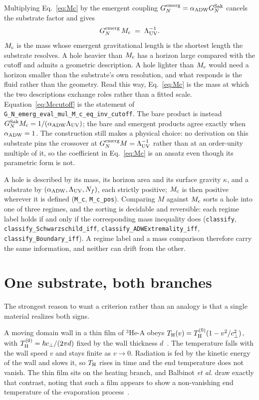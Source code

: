 \documentclass[aps,prl,reprint,nofootinbib,superscriptaddress]{revtex4-2}
\newcommand{\Thawk}{T_{\rm H}}
\newcommand{\Mc}{M_{\rm c}}
\newcommand{\aADW}{\alpha_{\rm ADW}}
\newcommand{\Ladw}{\Lambda_{\rm UV}}
\newcommand{\Nf}{N_f}
\newcommand{\GNem}{G_N^{\rm emerg}}
\begin{document}
Multiplying Eq.~\eqref{eq:Mc} by the emergent coupling $\GNem = \aADW G_N^{\rm Sak}$ cancels the substrate factor and gives
\begin{equation}
  \GNem\,\Mc \;=\; \Ladw^{-1}.
  \label{eq:Mccutoff}
\end{equation}
$\Mc$ is the mass whose emergent gravitational length is the shortest
length the substrate resolves. A hole heavier than $\Mc$ has a horizon
large compared with the cutoff and admits a geometric description. A hole
lighter than $\Mc$ would need a horizon smaller than the substrate's own
resolution, and what responds is the fluid rather than the geometry. Read
this way, Eq.~\eqref{eq:Mc} is the mass at which the two descriptions
exchange roles rather than a fitted scale. Equation~\eqref{eq:Mccutoff} is
the statement of
\texttt{G\_N\_emerg\_eval\_mul\_M\_c\_eq\_inv\_cutoff}.
The bare product is instead $G_N^{\rm Sak}\Mc=1/(\aADW\Ladw)$;
the bare and emergent products agree exactly when $\aADW=1$.
The construction still makes a physical choice: no derivation on this
substrate pins the crossover at $\GNem M = \Ladw^{-1}$ rather than at an
order-unity multiple of it, so the coefficient in Eq.~\eqref{eq:Mc} is an
ansatz even though its parametric form is not.

A hole is described by its mass, its horizon area and its surface gravity
$\kappa$, and a substrate by $(\aADW, \Ladw, \Nf)$, each strictly positive;
$\Mc$ is then positive wherever it is defined
(\texttt{M\_c}, \texttt{M\_c\_pos}). Comparing $M$ against $\Mc$ sorts a
hole into one of three regimes, and the sorting is decidable and
reversible: each regime label holds if and only if the corresponding mass
inequality does (\texttt{classify}, \texttt{classify\_Schwarzschild\_iff},
\texttt{classify\_ADWExtremality\_iff}, \texttt{classify\_Boundary\_iff}).
A regime label and a mass comparison therefore carry the same information,
and neither can drift from the other.

\section{One substrate, both branches}
\label{sec:onesubstrate}

The strongest reason to want a criterion rather than an analogy is that a
single material realizes both signs.

A moving domain wall in a thin film of $^{3}$He-A obeys
$\Thawk(v) = \Thawk^{(0)}(1 - v^{2}/c_\perp^{2})$, with
$\Thawk^{(0)} = \hbar c_\perp/(2\pi d)$ fixed by the wall thickness
$d$~\cite{JacobsonKoike2002}. The temperature falls with the wall speed $v$
and stays finite as $v \to 0$. Radiation is fed by the kinetic energy of
the wall and slows it, so $\Thawk$ rises in time and the end temperature
does not vanish. The thin film sits on the heating branch, and Balbinot
\textit{et al.} draw exactly that contrast, noting that such a film appears
to show a non-vanishing end temperature of the evaporation
process~\cite{Balbinot2005PRD}.
\end{document}

